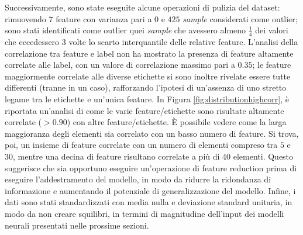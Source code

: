Successivamente, sono state eseguite alcune operazioni di pulizia del dataset: rimuovendo $7$ feature con varianza pari a $0$ e $425$ \textit{sample} considerati come outlier; sono stati identificati come outlier quei \textit{sample} che avessero almeno $\frac{1}{4}$ dei valori che eccedessero $3$ volte lo scarto interquantile delle relative feature.
L'analisi della correlazione tra feature e label non ha mostrato la presenza di feature altamente correlate alle label, con un valore di correlazione massimo pari a $0.35$; le feature maggiormente correlate alle diverse etichette si sono inoltre rivelate essere tutte differenti (tranne in un caso), rafforzando l'ipotesi di un'assenza di uno stretto legame tra le etichette e un'unica feature.
In Figura \ref{fig:distributionhighcorr}, è riportata un'analisi di come le varie feature/etichette sono risultate altamente correlate ($> 0.90$) con altre feature/etichette. 
È possibile vedere come la larga maggioranza degli elementi sia correlato con un basso numero di feature.
Si trova, poi, un insieme di feature correlate con un numero di elementi compreso tra $5$ e $30$, mentre una decina di feature risultano correlate a più di 40 elementi. 
Questo suggerisce che sia opportuno eseguire un'operazione di feature reduction prima di eseguire l'addestramento del modello, in modo da ridurre la ridondanza di informazione e aumentando il potenziale di generalizzazione del modello.
Infine, i dati sono stati standardizzati con media nulla e deviazione standard unitaria, in modo da non creare squilibri, in termini di magnitudine dell'input dei modelli neurali presentati nelle prossime sezioni.%